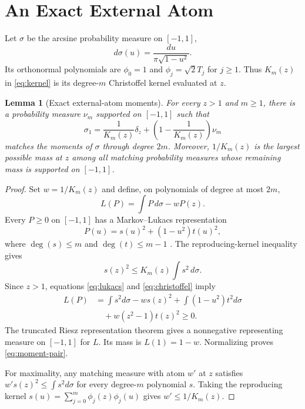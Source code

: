 \documentclass[twoside]{article}
\newtheorem{lemma}[theorem]{Lemma}
\newcommand{\1}{\mathbf 1}
\begin{document}
\section{An Exact External Atom}
\label{sec:moment}

Let $\sigma$ be the arcsine probability measure on $[-1,1]$,
\begin{equation}
 d\sigma(u)=\frac{du}{\pi\sqrt{1-u^2}}.
 \label{eq:arcsine}
\end{equation}
Its orthonormal polynomials are $\phi_0=1$ and $\phi_j=\sqrt2T_j$ for $j\ge1$. Thus $K_m(z)$ in \eqref{eq:kernel} is its degree-$m$ Christoffel kernel evaluated at $z$.

\begin{lemma}[Exact external-atom moments]
\label{lem:moment}
For every $z>1$ and $m\ge1$, there is a probability measure $\nu_m$ supported on $[-1,1]$ such that
\begin{equation}
 \sigma_1=\frac1{K_m(z)}\delta_z+
 \left(1-\frac1{K_m(z)}\right)\nu_m
 \label{eq:moment-pair}
\end{equation}
matches the moments of $\sigma$ through degree $2m$. Moreover, $1/K_m(z)$ is the largest possible mass at $z$ among all matching probability measures whose remaining mass is supported on $[-1,1]$.
\end{lemma}

\begin{proof}
Set $w=1/K_m(z)$ and define, on polynomials of degree at most $2m$, \[ L(P)=\int P\,d\sigma-wP(z). \] Every $P\ge0$ on $[-1,1]$ has a Markov--Lukacs representation
\begin{equation}
 P(u)=s(u)^2+(1-u^2)t(u)^2,
 \label{eq:lukacs}
\end{equation}
where $\deg(s)\le m$ and $\deg(t)\le m-1$ \citep[Section 2.5]{wu2020polynomial}. The reproducing-kernel inequality gives
\begin{equation}
 s(z)^2\le K_m(z)\int s^2\,d\sigma.
 \label{eq:christoffel}
\end{equation}
Since $z>1$, equations \eqref{eq:lukacs} and \eqref{eq:christoffel} imply
\begin{align*}
 L(P)&=\int s^2d\sigma-ws(z)^2+\int(1-u^2)t^2d\sigma\\
 &\quad+w(z^2-1)t(z)^2\ge0.
\end{align*}
The truncated Riesz representation theorem gives a nonnegative representing measure on $[-1,1]$ for $L$. Its mass is $L(1)=1-w$. Normalizing proves \eqref{eq:moment-pair}.

For maximality, any matching measure with atom $w'$ at $z$ satisfies $w's(z)^2\le\int s^2d\sigma$ for every degree-$m$ polynomial $s$. Taking the reproducing kernel $s(u)=\sum_{j=0}^m\phi_j(z)\phi_j(u)$ gives $w'\le1/K_m(z)$.
\end{proof}
\end{document}
